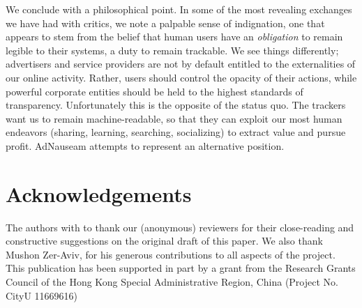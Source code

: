 \documentclass[conference]{IEEEtran}
\begin{document}
We conclude with a philosophical point. In some of the most revealing exchanges we have had with critics, we note a palpable sense of indignation, one that appears to stem from the belief that human users have an \emph{obligation} to remain legible to their systems, a duty to remain trackable. We see things differently; advertisers and service providers are not by default entitled to the externalities of our online activity. Rather, users should control the opacity of their actions, while powerful corporate entities should be held to the highest standards of transparency. Unfortunately this is the opposite of the status quo. The trackers want us to remain machine-readable, so that they can exploit our most human endeavors (sharing, learning, searching, socializing) to extract value and pursue profit. AdNauseam attempts to represent an alternative position.

\section*{Acknowledgements}
The authors with to thank our (anonymous) reviewers for their close-reading and constructive suggestions on the original draft of this paper. We also thank Mushon Zer-Aviv, for his generous contributions to all aspects of the project.  This publication has been supported in part by a grant from the Research Grants Council of the Hong Kong Special Administrative Region, China (Project No. CityU 11669616)
\end{document}
